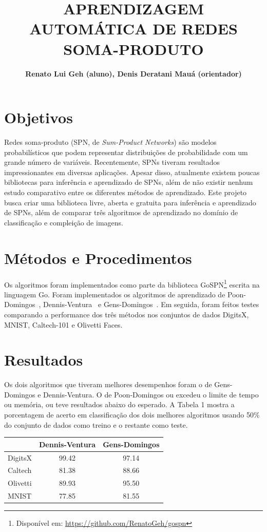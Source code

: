 \documentclass[10pt,a4paper]{article}
\title{APRENDIZAGEM AUTOMÁTICA DE REDES SOMA-PRODUTO}
\author{\textbf{Renato Lui Geh (aluno), Denis Deratani Mauá (orientador)}}
\affil{Instituto de Matemática e Estatística, Universidade de São Paulo}
\affil{\fontsize{10pt}{12}\selectfont\{renatolg,ddm\}@ime.usp.br}
\date{}
\begin{document}
\maketitle

\begin{multicols*}{2}

\section*{Objetivos}

Redes soma-produto (SPN, de \textit{Sum-Product Networks}) são modelos probabilísticos que podem
representar distribuições de probabilidade com um grande número de variáveis.  Recentemente, SPNs
tiveram resultados impressionantes em diversas aplicações.  Apesar disso, atualmente existem poucas
bibliotecas para inferência e aprendizado de SPNs, além de não existir nenhum estudo comparativo
entre os diferentes métodos de aprendizado.  Este projeto busca criar uma biblioteca livre, aberta
e gratuita para inferência e aprendizado de SPNs, além de comparar três algoritmos de aprendizado
no domínio de classificação e compleição de imagens.

\section*{Métodos e Procedimentos}

Os algoritmos foram implementados como parte da biblioteca GoSPN\footnote{Disponível em:
  \url{https://github.com/RenatoGeh/gospn}} escrita na linguagem Go.  Foram implementados os
algoritmos de aprendizado de Poon-Domingos~\cite{poon-domingos}, Dennis-Ventura~\cite{clustering} e
Gens-Domingos~\cite{gens-domingos}. Em seguida, foram feitos testes comparando a performance dos
três métodos nos conjuntos de dados DigitsX, MNIST, Caltech-101 e Olivetti Faces.

\section*{Resultados}

Os dois algoritmos que tiveram melhores desempenhos foram o de Gens-Domingos e Dennis-Ventura. O de
Poon-Domingos ou excedeu o limite de tempo ou memória, ou teve resultados abaixo do esperado. A
Tabela 1 mostra a porcentagem de acerto em classificação dos dois melhores algoritmos usando 50\%
do conjunto de dados como treino e o restante como teste.
\vspace{-0.2cm}
\begin{tabular}{l|c|c}
  & Dennis-Ventura & Gens-Domingos\\
  \hline
  DigitsX & 99.42 & 97.14\\
  Caltech & 81.38 & 88.66\\
  Olivetti& 89.93 & 95.50\\
  MNIST   & 77.85 & 81.55\\
\end{tabular}


\end{multicols*}
\end{document}
